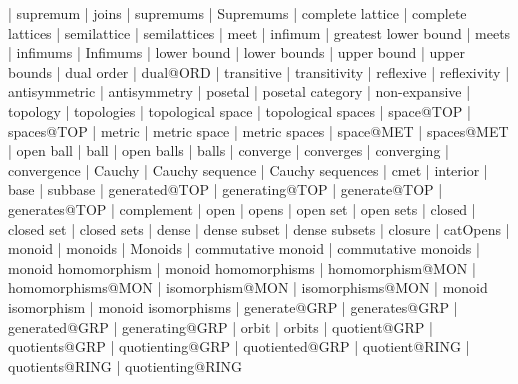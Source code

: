     |   supremum
    |   joins
    |   supremums
    |   Supremums
    |   complete lattice
    |   complete lattices
    |   semilattice
    |   semilattices
    |   meet
    |   infimum
    |   greatest lower bound
    |   meets
    |   infimums
    |   Infimums
    |   lower bound
    |   lower bounds
    |   upper bound
    |   upper bounds
    |   dual order
    |   dual@ORD
    |   transitive
    |   transitivity
    |   reflexive
    |   reflexivity
    |   antisymmetric
    |   antisymmetry
    |   posetal
    |   posetal category
    |   non-expansive
    |   topology
    |   topologies
    |   topological space
    |   topological spaces
    |   space@TOP
    |   spaces@TOP
    |   metric
    |   metric space
    |   metric spaces
    |   space@MET
    |   spaces@MET
    |   open ball
    |   ball
    |   open balls
    |   balls
    |   converge
    |   converges
    |   converging
    |   convergence
    |   Cauchy
    |   Cauchy sequence
    |   Cauchy sequences
    |   cmet
    |   interior
    |   base
    |   subbase
    |   generated@TOP
    |   generating@TOP
    |   generate@TOP
    |   generates@TOP
    |   complement
    |   open
    |   opens
    |   open set
    |   open sets
    |   closed
    |   closed set
    |   closed sets
    |   dense
    |   dense subset
    |   dense subsets
    |   closure
    |   catOpens
    |   monoid
    |   monoids
    |   Monoids
    |   commutative monoid
    |   commutative monoids
    |   monoid homomorphism
    |   monoid homomorphisms
    |   homomorphism@MON
    |   homomorphisms@MON
    |   isomorphism@MON
    |   isomorphisms@MON
    |   monoid isomorphism
    |   monoid isomorphisms
    |   generate@GRP
    |   generates@GRP
    |   generated@GRP
    |   generating@GRP
    |   orbit
    |   orbits
    |   quotient@GRP
    |   quotients@GRP
    |   quotienting@GRP
    |   quotiented@GRP
    |   quotient@RING
    |   quotients@RING
    |   quotienting@RING
